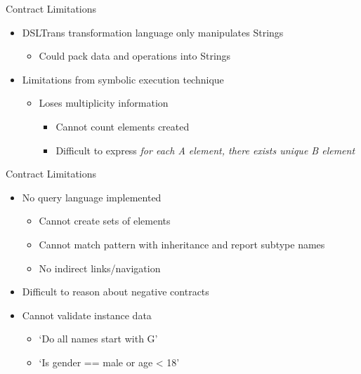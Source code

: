 \documentclass[xcolor=dvipsnames, 12pt, handout]{beamer}
\begin{document}
\begin{frame}{Contract Limitations}

\begin{itemize}
\item DSLTrans transformation language only manipulates Strings
\begin{itemize}
\item Could pack data and operations into Strings
\end{itemize}
\end{itemize}

\begin{itemize}
\item Limitations from symbolic execution technique
\begin{itemize}
\item Loses multiplicity information
\begin{itemize}
\item Cannot count elements created
\item Difficult to express \textit{for each A element, there exists unique B element}
\end{itemize}
\end{itemize}
\end{itemize}

\end{frame}

\begin{frame}{Contract Limitations}

\begin{itemize}
\item No query language implemented
\begin{itemize}
\item Cannot create sets of elements
\item Cannot match pattern with inheritance and report subtype names
\item No indirect links/navigation
\end{itemize}
\item Difficult to reason about negative contracts
\item Cannot validate instance data
\begin{itemize}
\item `Do all names start with G'
\item `Is gender == male or age < 18'
\end{itemize}
\end{itemize}

\end{frame}
\end{document}
